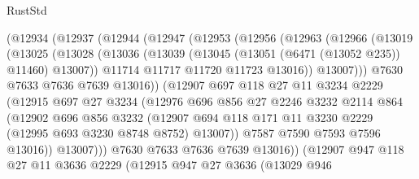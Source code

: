 \begin{lexlean}{RustStd}
\begin{coremodule}
{\begin{coremodule}
{{{{{{{{{{{{{{{{{{{{{{{{{{            (@12934
              (@12937
                (@12944
                  (@12947
                    (@12953
                      (@12956
                        (@12963
                          (@12966
                            (@13019
                              (@13025
                                (@13028
                                  (@13036
                                    (@13039 (@13045 (@13051 (@6471 (@13052 @235)) @11460) @13007))
                                    @11714
                                    @11717
                                    @11720
                                    @11723
                                    @13016))
                                @13007)))
                          @7630
                          @7633
                          @7636
                          @7639
                          @13016))
                      (@12907
                        @697
                        @118
                        @27
                        @11
                        @3234
                        @2229
                        (@12915
                          @697
                          @27
                          @3234
                          (@12976
                            @696
                            @856
                            @27
                            @2246
                            @3232
                            @2114
                            @864
                            (@12902
                              @696
                              @856
                              @3232
                              (@12907
                                @694
                                @118
                                @171
                                @11
                                @3230
                                @2229
                                (@12995 @693 @3230 @8748 @8752)
                                @13007))
                            @7587
                            @7590
                            @7593
                            @7596
                            @13016))
                        @13007)))
                  @7630
                  @7633
                  @7636
                  @7639
                  @13016))
              (@12907
                @947
                @118
                @27
                @11
                @3636
                @2229
                (@12915
                  @947
                  @27
                  @3636
                  (@13029
                    @946
}}}}}}}}}}}}}}}}}}}}}}}}}}
\end{coremodule}}
\end{coremodule}
\end{lexlean}
